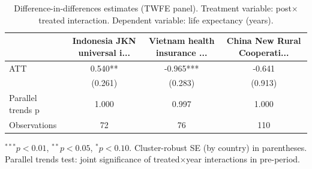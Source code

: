 \begin{table}[htbp]
\centering
\caption{Difference-in-differences estimates (TWFE panel). Treatment variable: post$\times$treated interaction. Dependent variable: life expectancy (years).}
\label{tab:did}
\begin{tabular}{lccc}
\toprule
 & Indonesia JKN universal i... & Vietnam health insurance ... & China New Rural Cooperati... \\
\midrule
ATT & 0.540** & -0.965*** & -0.641 \\
 & (0.261) & (0.283) & (0.913) \\
\midrule
Parallel trends p & 1.000 & 0.997 & 1.000 \\
Observations & 72 & 76 & 110 \\
\bottomrule
\end{tabular}
\begin{tablenotes}\small\item $^{***}p<0.01$, $^{**}p<0.05$, $^{*}p<0.10$. Cluster-robust SE (by country) in parentheses. Parallel trends test: joint significance of treated$\times$year interactions in pre-period.\end{tablenotes}
\end{table}